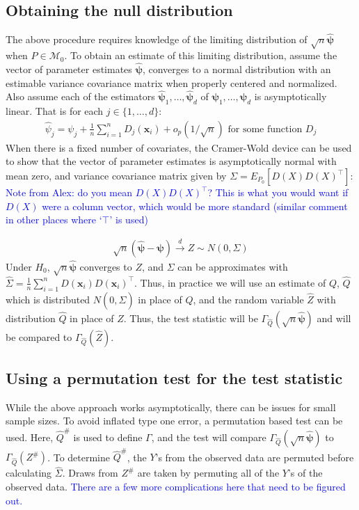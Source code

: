 \documentclass{article}
\newcommand{\rvo}{X}
\newcommand{\disto}{P}
\newcommand{\rvv}{Z}
\newcommand{\distv}{Q}
\begin{document}
\subsection{Obtaining the null distribution}
\label{ssec:obtaining_null}
The above procedure requires knowledge of the limiting distribution of $\sqrt{n}\hat{\boldsymbol{\psi}}$ when $P \in \mathscr{M}_0$.  To obtain an estimate of this limiting distribution, assume the vector of parameter estimates $\hat{\boldsymbol{\psi}}$, converges to a normal distribution with an estimable variance covariance matrix when properly centered and normalized. Also assume each of the estimators $\hat{\boldsymbol{\psi}}_1, \dots, \hat{\boldsymbol{\psi}}_d$ of $\boldsymbol{\psi}_1, \dots, \boldsymbol{\psi}_d$ is asymptotically linear.  That is for each $j \in \{1, \dots, d\}$:
\begin{align*}
\hat{\psi}_j = \psi_j + \frac{1}{n}\sum_{i=1}^n D_j(\boldsymbol{x}_i) + o_p(1/\sqrt{n}) \text{ for some function } D_j
\end{align*}
When there is a fixed number of covariates, the Cramer-Wold device can be used to show that the vector of parameter estimates is asymptotically normal with mean zero, and variance covariance matrix given by $\Sigma = E_{\disto_0}\left[D(\rvo) D(\rvo)^\top \right]$:
 \textcolor{blue}{Note from Alex: do you mean $D(\rvo) D(\rvo)^\top$? This is what you would want if $D(\rvo)$ were a column vector, which would be more standard (similar comment in other places where `$\top$' is used)}

\begin{align*}
    \sqrt{n}\left(\hat{\boldsymbol{\psi}} - \boldsymbol{\psi}\right) \xrightarrow{d} Z \sim N\left(0, \Sigma\right)
\end{align*}
Under $H_0$, $\sqrt{n}\hat{\boldsymbol{\psi}}$ converges to $Z$, and $\Sigma$ can be approximates with $\widehat{\Sigma} = \frac{1}{n}\sum_{i = 1}^n D(\boldsymbol{x}_i) D(\boldsymbol{x}_i)^\top$.  Thus, in practice we will use an estimate of $\distv$, $\hat{\distv}$ which is distributed $N(0, \widehat{\Sigma})$ in place of $\distv$, and the random variable $\hat{\rvv}$ with distribution $\hat{\distv}$ in place of $\rvv$.  Thus, the test statistic will be $\Gamma_{\hat{\distv}}(\sqrt{n} \hat{\boldsymbol{\psi}})$ and will be compared to $\Gamma_{\hat{\distv}}(\hat{\rvv})$.

\subsection{Using a permutation test for the test statistic}
While the above approach works asymptotically, there can be issues for small sample sizes.  To avoid inflated type one error, a permutation based test can be used.  Here, $\hat{\distv}^\#$ is used to define $\Gamma$, and the test will compare $\Gamma_{\hat{\distv}}(\sqrt{n} \hat{\boldsymbol{\psi}})$ to $\Gamma_{\hat{\distv}}(\rvv^\#)$. To determine $\hat{\distv}^\#$, the $Y$'s from the observed data are permuted before calculating $\widehat \Sigma$.  Draws from $\rvv^\#$ are taken by permuting all of the $Y$'s of the observed data.  \textcolor{blue}{There are a few more complications here that need to be figured out.}
\end{document}
